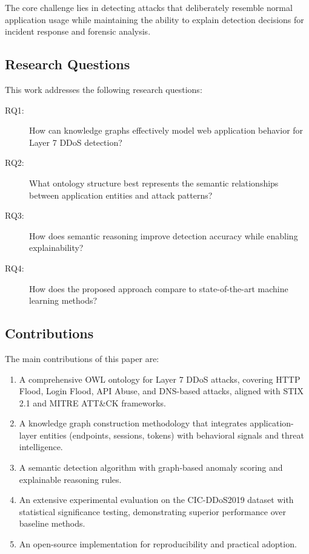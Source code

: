 \documentclass[preprint,12pt]{elsarticle}
\begin{document}
The core challenge lies in detecting attacks that deliberately resemble normal application usage while maintaining the ability to explain detection decisions for incident response and forensic analysis.

\subsection{Research Questions}

This work addresses the following research questions:

\begin{description}
    \item[RQ1:] How can knowledge graphs effectively model web application behavior for Layer 7 DDoS detection?
    \item[RQ2:] What ontology structure best represents the semantic relationships between application entities and attack patterns?
    \item[RQ3:] How does semantic reasoning improve detection accuracy while enabling explainability?
    \item[RQ4:] How does the proposed approach compare to state-of-the-art machine learning methods?
\end{description}

\subsection{Contributions}

The main contributions of this paper are:

\begin{enumerate}
    \item A comprehensive OWL ontology for Layer 7 DDoS attacks, covering HTTP Flood, Login Flood, API Abuse, and DNS-based attacks, aligned with STIX 2.1 and MITRE ATT\&CK frameworks.
    
    \item A knowledge graph construction methodology that integrates application-layer entities (endpoints, sessions, tokens) with behavioral signals and threat intelligence.
    
    \item A semantic detection algorithm with graph-based anomaly scoring and explainable reasoning rules.
    
    \item An extensive experimental evaluation on the CIC-DDoS2019 dataset with statistical significance testing, demonstrating superior performance over baseline methods.
    
    \item An open-source implementation for reproducibility and practical adoption.
\end{enumerate}
\end{document}
